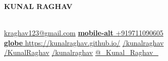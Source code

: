 \documentclass[10pt,a4paper]{extarticle}
\begin{document}
\noindent
\begin{minipage}{0.4\textwidth}
	\begin{huge}
		{
			\color{resumeBlueDark}
			\bfseries{ KUNAL RAGHAV}\\\\
		}
	\end{huge}
\end{minipage}
\hfill
\begin{minipage}{0.55\textwidth}
	\vspace{-5mm}
	\href{mailto:kraghav123@gmail.com}{\textbf{\color{cyan} } kraghav123@gmail.com} \hspace{2mm} 
	\href{tel:+919711090605}{\textbf{\color{cyan} \fontAwesome mobile-alt} +919711090605}\\
	\href{https://kunalraghav.github.io/}{{\textbf{\color{cyan}\fontAwesome globe}}  https://kunalraghav.github.io/} \hspace{2mm}
	\href{https://peerlist.io/kunalraghav}{\textbf{\color{cyan} }/kunalraghav}\\
	\href{https://github.com/KunalRaghav}{\textbf{\color{cyan} }/KunalRaghav} \hspace{2mm}
	\href{https://www.linkedin.com/in/kunalraghav/}{\textbf{\color{cyan} }/kunalraghav} \hspace{2mm}
	\href{https://www.twitter.com/_kunal_raghav_/}{\textbf{\color{cyan} }@\_Kunal\_Raghav\_} \\
	
\end{minipage}
\end{document}
